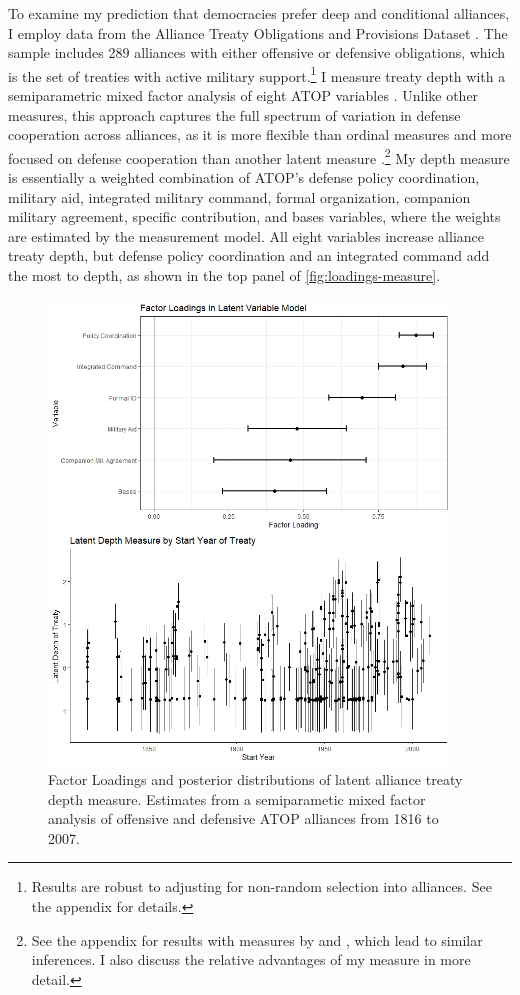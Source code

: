 \documentclass[12pt]{article}
\begin{document}
To examine my prediction that democracies prefer deep and conditional alliances, I employ data from the Alliance Treaty Obligations and Provisions Dataset \citep{Leedsetal2002}. 
The sample includes 289 alliances with either offensive or defensive obligations, which is the set of treaties with active military support.\footnote{Results are robust to adjusting for non-random selection into alliances. See the appendix for details.} 
I measure treaty depth with a semiparametric mixed factor analysis of eight ATOP variables \citep{Murrayetal2013}.
Unlike other measures, this approach captures the full spectrum of variation in defense cooperation across alliances, as it is more flexible than ordinal measures \citep{LeedsAnac2005} and more focused on defense cooperation than another latent measure \citep{BensonClinton2016}.\footnote{See the appendix for results with measures by \citet{LeedsAnac2005} and \citet{BensonClinton2016}, which lead to similar inferences. I also discuss the relative advantages of my measure in more detail.}
My depth measure is essentially a weighted combination of ATOP's defense policy coordination, military aid, integrated military command, formal organization, companion military agreement, specific contribution, and bases variables, where the weights are estimated by the measurement model.  
All eight variables increase alliance treaty depth, but defense policy coordination and an integrated command add the most to depth, as shown in the top panel of \autoref{fig:loadings-measure}. 


\begin{figure}[hbtp]
\centering
\includegraphics[width=0.95\textwidth]{../figures/loadings-measure.png}
\caption{Factor Loadings and posterior distributions of latent alliance treaty depth measure. Estimates from a semiparametic mixed factor analysis of offensive and defensive ATOP alliances from 1816 to 2007.}
\label{fig:loadings-measure}
\end{figure}
\end{document}
